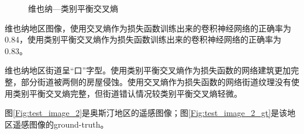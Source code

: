\begin{figure}[htbp]
\begin{minipage}[t]{0.49\linewidth}
        \caption{维也纳—类别平衡交叉熵}
        \label{Fig:test_image_2_cbce}
    \end{minipage}
    
\end{figure}
维也纳地区图像，使用交叉熵作为损失函数训练出来的卷积神经网络的正确率为0.84，使用类别平衡交叉熵作为损失函数训练出来的卷积神经网络的正确率为0.83。

维也纳地区街道呈“口”字型。使用类别平衡交叉熵作为损失函数的网络建筑更加完整，部分街道被两侧的房屋侵蚀。使用交叉熵作为损失函数的网络街道纹理没有使用类别平衡交叉熵完整，但街道错认情况较类别平衡交叉熵轻微。


图\ref{Fig:test_image_2}是奥斯汀地区的遥感图像；图\ref{Fig:test_image_2_gt}是该地区遥感图像的ground-truth。
\begin{figure}[htbp]
    

\end{figure}
